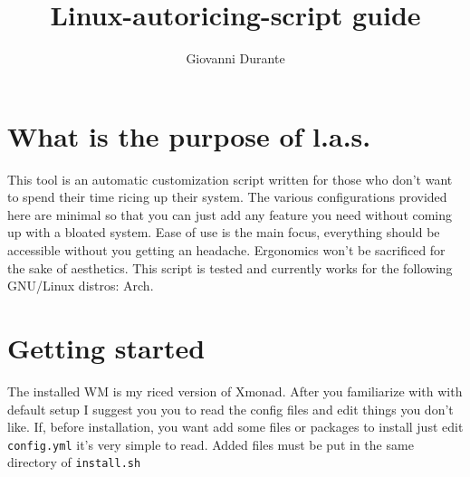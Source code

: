\documentclass{article}
\date{}
\title{Linux-autoricing-script guide}
\author{Giovanni Durante}
\begin{document}
\maketitle
\section*{What is the purpose of l.a.s.}
This tool is an automatic customization script written for those who don't want to spend their time ricing up their system. The various configurations provided here are minimal so that you can just add any feature you need without coming up with a bloated system. Ease of use is the main focus, everything should be accessible without you getting an headache. Ergonomics won't be sacrificed for the sake of aesthetics. This script is tested and currently works for the following GNU/Linux distros: Arch.

\section*{Getting started}
The installed WM is my riced version of Xmonad. After you familiarize with with default setup I suggest you you to read the config files and edit things you don't like. If, before installation, you want add some files or packages to install just edit \verb|config.yml| it's very simple to read. Added files must be put in the same directory of \verb|install.sh|
\end{document}

